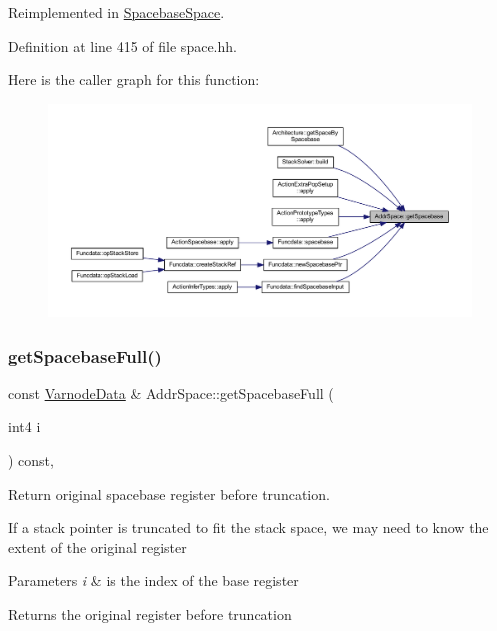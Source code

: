 Reimplemented in \mbox{\hyperlink{class_spacebase_space_af8f5c5b9da9bd74ef022bd0c5c18c2ea}{Spacebase\+Space}}.



Definition at line 415 of file space.\+hh.

Here is the caller graph for this function\+:
\nopagebreak
\begin{figure}[H]
\begin{center}
\leavevmode
\includegraphics[width=350pt]{class_addr_space_ad6b5eb815514577118d9b998447cc4d0_icgraph}
\end{center}
\end{figure}
\mbox{\label{class_addr_space_a8fb25cf630f64ad73a137393b48067a0}} 
\subsubsection{\texorpdfstring{getSpacebaseFull()}{getSpacebaseFull()}}
{\footnotesize\ttfamily const \mbox{\hyperlink{struct_varnode_data}{Varnode\+Data}} \& Addr\+Space\+::get\+Spacebase\+Full (\begin{DoxyParamCaption}\item[{int4}]{i }\end{DoxyParamCaption}) const\hspace{0.3cm}{\ttfamily [inline]}, {\ttfamily [virtual]}}



Return original spacebase register before truncation. 

If a stack pointer is truncated to fit the stack space, we may need to know the extent of the original register 
\begin{DoxyParams}{Parameters}
{\em i} & is the index of the base register \\
\hline
\end{DoxyParams}
\begin{DoxyReturn}{Returns}
the original register before truncation 
\end{DoxyReturn}


